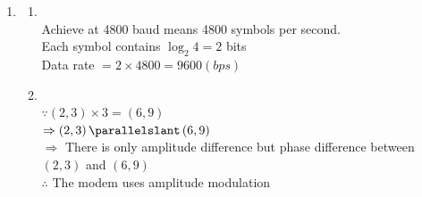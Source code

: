 \documentclass[10pt, a4paper]{article}
\begin{document}
\begin{enumerate}
\item\mbox{}
    \begin{enumerate}
    \item\mbox{}\\
        Achieve at 4800 baud means 4800 symbols per second.\\
        Each symbol contains $\log_2 4 = 2$ bits\\
        Data rate $= 2 \times 4800 = 9600 (bps)$
    \item\mbox{}\\
        $\because \left(2, 3\right) \times 3 = \left(6, 9\right)$\\
        $\Rightarrow \left(2, 3\right) \parallelslant \left(6, 9\right)$\\
        $\Rightarrow$ There is only amplitude difference but phase difference between $\left(2, 3\right)$ and $\left(6, 9\right)$\\
        $\therefore$ The modem uses amplitude modulation
    \end{enumerate}


\end{enumerate}
\end{document}
